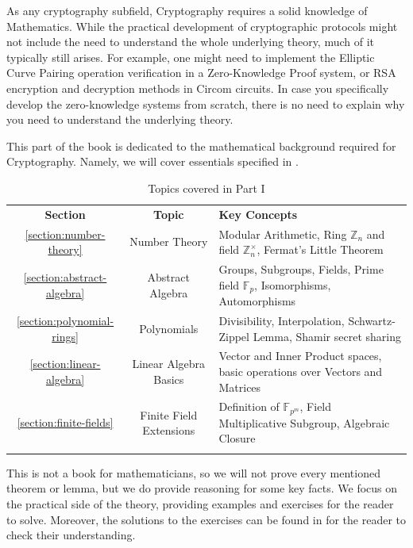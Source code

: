 \documentclass[../../../book]{subfiles}
\begin{document}
As any cryptography subfield, Cryptography requires a solid knowledge of
Mathematics. While the practical development of cryptographic protocols might
not include the need to understand the whole underlying theory, much of it
typically still arises. For example, one might need to implement the Elliptic
Curve Pairing operation verification in a Zero-Knowledge Proof system, or RSA
encryption and decryption methods in Circom circuits. In case you specifically
develop the zero-knowledge systems from scratch, there is no need to explain why
you need to understand the underlying theory.

This part of the book is dedicated to the mathematical background required for
Cryptography. Namely, we will cover essentials specified in .

\begin{table}[H]
    \centering
    \begin{tabularx}{\textwidth}{ccX}
        \Xhline{3\arrayrulewidth}
        \rowcolor{blue!30}\textbf{Section} & \textbf{Topic} & \textbf{Key Concepts} \\
        \Xhline{3\arrayrulewidth}
        \rowcolor{blue!10}\ref{section:number-theory} & Number Theory & Modular
        Arithmetic, Ring $\mathbb{Z}_n$ and field $\mathbb{Z}_n^{\times}$,
        Fermat's Little Theorem \\
        \hline
        \rowcolor{blue!20}\ref{section:abstract-algebra} & Abstract Algebra &
        Groups, Subgroups, Fields, Prime field $\mathbb{F}_p$, Isomorphisms,
        Automorphisms \\
        \hline
        \rowcolor{blue!10}\ref{section:polynomial-rings} & Polynomials & Divisibility, Interpolation, Schwartz-Zippel Lemma, Shamir secret sharing \\
        \hline
        \rowcolor{blue!20}\ref{section:linear-algebra} & Linear Algebra Basics & Vector and Inner Product spaces, basic operations over Vectors and Matrices \\
        \hline
        \rowcolor{blue!10}\ref{section:finite-fields} & Finite Field Extensions & Definition of $\mathbb{F}_{p^m}$, Field Multiplicative Subgroup, Algebraic Closure \\
        \Xhline{3\arrayrulewidth}
    \end{tabularx}
    \caption{Topics covered in Part I}
    \label{tab:essentialls}
\end{table}

This is not a book for mathematicians, so we will not prove every mentioned theorem
or lemma, but we do provide reasoning for some key facts. We
focus on the practical side of the theory, providing examples and exercises for
the reader to solve. Moreover, the solutions to the exercises can be found 
in  for the reader to check their understanding.
\end{document}
